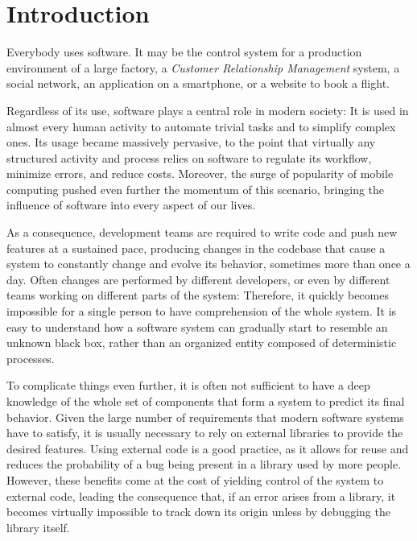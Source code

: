 
\chapter{Introduction}\label{ch:introduction}

Everybody uses software.
It may be the control system for a production environment of a large factory, a \emph{Customer Relationship Management} system, a social network, an application on a smartphone, or a website to book a flight.

Regardless of its use, software plays a central role in modern society: It is used in almost every human activity to automate trivial tasks and to simplify complex ones.
Its usage became massively pervasive, to the point that virtually any structured activity and process relies on software to regulate its workflow, minimize errors, and reduce costs.
Moreover, the surge of popularity of mobile computing pushed even further the momentum of this scenario, bringing the influence of software into every aspect of our lives.

As a consequence, development teams are required to write code and push new features at a sustained pace, producing changes in the codebase that cause a system to constantly change and evolve its behavior, sometimes more than once a day.
Often changes are performed by different developers, or even by different teams working on different parts of the system: Therefore, it quickly becomes impossible for a single person to have comprehension of the whole system.
It is easy to understand how a software system can gradually start to resemble an unknown black box, rather than an organized entity composed of deterministic processes.

To complicate things even further, it is often not sufficient to have a deep knowledge of the whole set of components that form a system to predict its final behavior.
Given the large number of requirements that modern software systems have to satisfy, it is usually necessary to rely on external libraries to provide the desired features.
Using external code is a good practice, as it allows for reuse and reduces the probability of a bug being present in a library used by more people.
However, these benefits come at the cost of yielding control of the system to external code, leading the consequence that, if an error arises from a library, it becomes virtually impossible to track down its origin unless by debugging the library itself.

